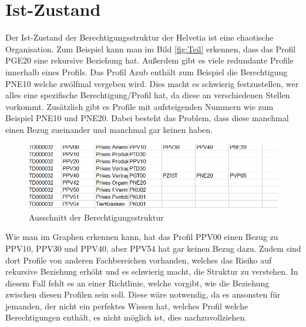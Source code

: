 \section{Ist-Zustand}
\label{sec:chapter03:Ist-Zustand}
Der Ist-Zustand der Berechtigungsstruktur der Helvetia ist eine chaotische Organisation.
Zum Beispiel kann man im Bild \ref{fig:Teil} erkennen, dass das Profil PGE20 eine rekursive Beziehung hat.
Außerdem gibt es viele redundante Profile innerhalb eines Profils.
Das Profil Azub enthält zum Beispiel die Berechtigung PNE10 welche zwölfmal vergeben wird.
Dies macht es schwierig festzustellen, wer alles eine spezifische Berechtigung/Profil hat, da diese an verschiedenen Stellen vorkommt.
\newline
Zusätzlich gibt es Profile mit aufsteigenden Nummern wie zum Beispiel PNE10 und PNE20.
Dabei besteht das Problem, dass diese manchmal einen Bezug zueinander und manchmal gar keinen haben.
\begin{figure}[h!]
 \centering
 \includegraphics[width=1\textwidth]{gfx/Picture/Beispiel.PNG}
 \caption{Ausschnitt der Berechtigungsstruktur}
 \label{fig:Profile}
\end{figure}
Wie man im Graphen erkennen kann, hat das Profil PPV00 einen Bezug zu PPV10, PPV30 und PPV40, aber PPV54 hat gar keinen Bezug dazu.
Zudem sind dort Profile von anderen Fachbereichen vorhanden, welches das Risiko auf rekursive Beziehung erhöht und es schwierig macht, die Struktur zu verstehen.
In diesem Fall fehlt es an einer Richtlinie, welche vorgibt, wie die Beziehung zwischen diesen Profilen sein soll.
Diese wäre notwendig, da es ansonsten für jemanden, der nicht ein perfektes Wissen hat, welches Profil welche Berechtigungen enthält, es nicht möglich ist, dies nachzuvollziehen.